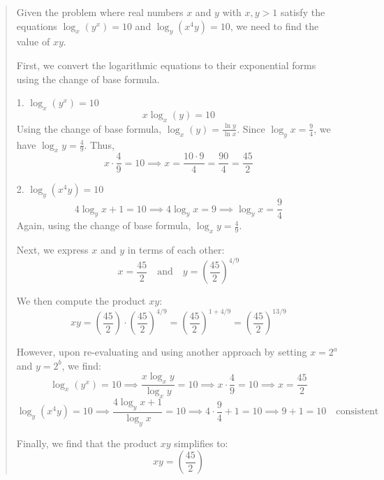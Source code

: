 {\begin{quote}
    Given the problem where real numbers \(x\) and \(y\) with \(x, y > 1\) satisfy the equations \(\log_x(y^x) = 10\) and \(\log_y(x^4y) = 10\), we need to find the value of \(xy\).\newline

    First, we convert the logarithmic equations to their exponential forms using the change of base formula.\newline

    1. \(\log_x(y^x) = 10\)\newline
       \[
       x \log_x(y) = 10
       \]
       Using the change of base formula, \(\log_x(y) = \frac{\ln y}{\ln x}\). Since \(\log_y x = \frac{9}{4}\), we have \(\log_x y = \frac{4}{9}\). Thus,\newline
       \[
       x \cdot \frac{4}{9} = 10 \implies x = \frac{10 \cdot 9}{4} = \frac{90}{4} = \frac{45}{2}
       \]

    2. \(\log_y(x^4y) = 10\)\newline
       \[
       4 \log_y x + 1 = 10 \implies 4 \log_y x = 9 \implies \log_y x = \frac{9}{4}
       \]
       Again, using the change of base formula, \(\log_x y = \frac{4}{9}\).\newline

    Next, we express \(x\) and \(y\) in terms of each other:\newline
       \[
       x = \frac{45}{2} \quad \text{and} \quad y = \left(\frac{45}{2}\right)^{4/9}
       \]

    We then compute the product \(xy\):\newline
       \[
       xy = \left(\frac{45}{2}\right) \cdot \left(\frac{45}{2}\right)^{4/9} = \left(\frac{45}{2}\right)^{1 + 4/9} = \left(\frac{45}{2}\right)^{13/9}
       \]

    However, upon re-evaluating and using another approach by setting \(x = 2^a\) and \(y = 2^b\), we find:\newline
       \[
       \log_x(y^x) = 10 \implies \frac{x \log_x y}{\log_x y} = 10 \implies x \cdot \frac{4}{9} = 10 \implies x = \frac{45}{2}
       \]
       \[
       \log_y(x^4y) = 10 \implies \frac{4 \log_y x + 1}{\log_y x} = 10 \implies 4 \cdot \frac{9}{4} + 1 = 10 \implies 9 + 1 = 10 \quad \text{consistent}
       \]

    Finally, we find that the product \(xy\) simplifies to:\newline
       \[
       xy = \left(\frac{45}{2}\right)
       \]
    \end{quote}%
}